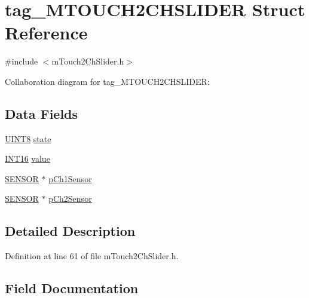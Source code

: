 \hypertarget{structtag___m_t_o_u_c_h2_c_h_s_l_i_d_e_r}{}\section{tag\+\_\+\+M\+T\+O\+U\+C\+H2\+C\+H\+S\+L\+I\+D\+E\+R Struct Reference}
\label{structtag___m_t_o_u_c_h2_c_h_s_l_i_d_e_r}


{\ttfamily \#include $<$m\+Touch2\+Ch\+Slider.\+h$>$}



Collaboration diagram for tag\+\_\+\+M\+T\+O\+U\+C\+H2\+C\+H\+S\+L\+I\+D\+E\+R\+:
\subsection*{Data Fields}
\begin{DoxyCompactItemize}
\item 
\hyperlink{_generic_type_defs_8h_ab27e9918b538ce9d8ca692479b375b6a}{U\+I\+N\+T8} \hyperlink{structtag___m_t_o_u_c_h2_c_h_s_l_i_d_e_r_a6e9c4cbd32a1178b12f3a61f6855c896}{state}
\item 
\hyperlink{_generic_type_defs_8h_ad87465075f24df28ef66f25e43f0bd5a}{I\+N\+T16} \hyperlink{structtag___m_t_o_u_c_h2_c_h_s_l_i_d_e_r_aedc7c0025d092e92a4cc5132a9a0634c}{value}
\item 
\hyperlink{m_touch_sensor_8h_a20ea6ae73be2b43f0c39bae385b66266}{S\+E\+N\+S\+O\+R} $\ast$ \hyperlink{structtag___m_t_o_u_c_h2_c_h_s_l_i_d_e_r_a41f98368630f8a733591c707f8dba5fb}{p\+Ch1\+Sensor}
\item 
\hyperlink{m_touch_sensor_8h_a20ea6ae73be2b43f0c39bae385b66266}{S\+E\+N\+S\+O\+R} $\ast$ \hyperlink{structtag___m_t_o_u_c_h2_c_h_s_l_i_d_e_r_a4d88a2538150ca92e2086160c812d5a4}{p\+Ch2\+Sensor}
\end{DoxyCompactItemize}


\subsection{Detailed Description}


Definition at line 61 of file m\+Touch2\+Ch\+Slider.\+h.



\subsection{Field Documentation}
\hypertarget{structtag___m_t_o_u_c_h2_c_h_s_l_i_d_e_r_a41f98368630f8a733591c707f8dba5fb}{}

